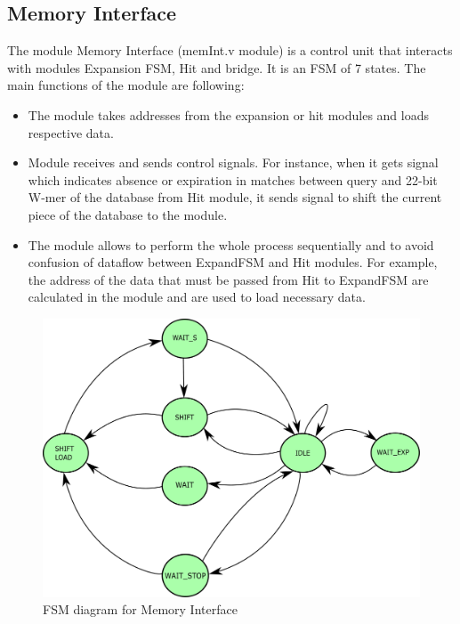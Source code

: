        
\subsection{Memory Interface}
\quad The module Memory Interface (memInt.v module) is a control unit that interacts with modules Expansion FSM, Hit and bridge. It is an FSM of 7 states. The main functions of the module are following:
\begin{itemize}
\item The module takes addresses from the expansion or hit modules and loads respective data.
\item Module receives and sends control signals. For instance, when it gets signal which indicates absence or expiration in matches between query and 22-bit W-mer of the database from Hit module, it sends signal to shift the current piece of the database to the module.
\item The module allows to perform the whole process sequentially and to avoid confusion of dataflow between ExpandFSM and Hit modules. For example, the address of the data that must be passed from Hit to ExpandFSM are calculated in the module and are used to load necessary data.
\end{itemize}

\begin{figure}
\centering
\includegraphics[width=\columnwidth]{Figures/FSM_Mem_New.pdf}
\caption{FSM diagram for Memory Interface} \label{fig:MemInt}
\end{figure}


